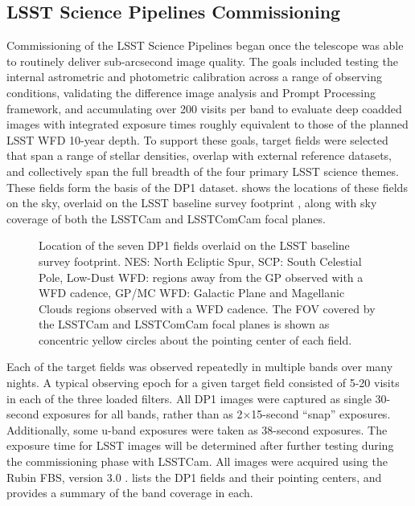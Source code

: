 \subsection{LSST Science Pipelines Commissioning
\label{ssec:pipelines_commissioning}}
Commissioning of the \gls{LSST Science Pipelines} \citep{PSTN-019} began once the telescope was able to routinely deliver sub-arcsecond image quality.
The goals included testing the internal astrometric and photometric calibration across a range of observing conditions, validating the difference image analysis and Prompt Processing \citep{dmtn-219} framework, and accumulating over 200 visits per band to evaluate deep coadded images with integrated exposure times roughly equivalent to those of the planned LSST \gls{WFD} 10-year depth.
To support these goals, \nfields target fields were selected that span a range of stellar densities, overlap with external reference datasets, and collectively span the full breadth of the four primary \gls{LSST} science themes.
These \nfields fields form the basis of the \gls{DP1} dataset.
 shows the locations of these \nfields fields on the sky, overlaid on the LSST baseline survey footprint \citep{PSTN-051, PSTN-052, PSTN-053, PSTN-055, PSTN-056}, along with sky coverage of both the LSSTCam and \gls{LSSTComCam} focal planes.
\begin{figure*}[bt!]
\centering
{}
\caption{Location of the seven DP1 fields overlaid on the \gls{LSST} baseline survey footprint. NES: North Ecliptic Spur, SCP: South Celestial Pole, Low-Dust WFD: regions away from the GP observed with a WFD cadence, GP/MC WFD: Galactic Plane and Magellanic Clouds regions observed with a WFD cadence. The \gls{FOV} covered by the \gls{LSSTCam} and \gls{LSSTComCam} focal planes is shown as concentric yellow circles about the pointing center of each field.}
\label{fig:dp1_fields_on_sky}
\end{figure*}
Each of the \nfields target fields was observed repeatedly in multiple bands over many nights.
A typical observing \gls{epoch} for a given target field consisted of 5-20 visits in each of the three loaded filters.
All DP1 images were captured as single 30-second exposures for all bands, rather than as 2×15-second “snap” exposures.
Additionally, some u-band exposures were taken as 38-second exposures.
The exposure time for LSST images will be determined after further testing during the commissioning phase with LSSTCam. 
All images were acquired using the Rubin \gls{FBS}, version 3.0 \citep{Naghib_2019, peter_yoachim_2024_13985198}.
 lists the \nfields \gls{DP1} fields and their pointing centers, and provides a summary of the band coverage in each.


